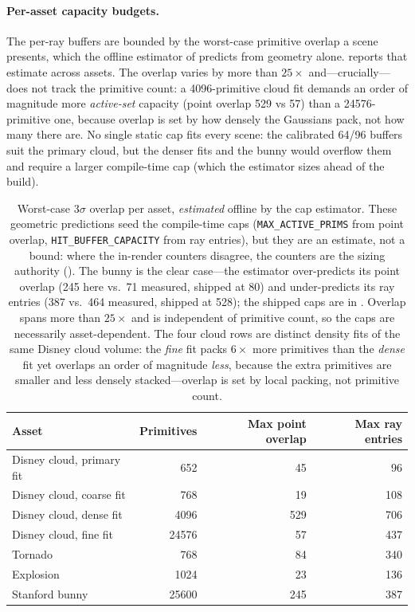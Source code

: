 \paragraph{Per-asset capacity budgets.} The per-ray buffers are bounded by the worst-case primitive
overlap a scene presents, which the offline estimator of  predicts from geometry
alone.  reports that estimate across assets. The overlap varies by more than
$25\times$ and---crucially---does not track the primitive count: a \num{4096}-primitive cloud fit
demands an order of magnitude more \emph{active-set} capacity (point overlap \num{529} vs \num{57}) than
a \num{24576}-primitive one, because overlap is set by
how densely the Gaussians pack, not how many there are. No single static cap fits every scene: the
calibrated \num{64}/\num{96} buffers suit the primary cloud, but the denser fits and the bunny would overflow them
and require a larger compile-time cap (which the estimator sizes ahead of the build).

\begin{table}[htp]
  \centering
  \begin{tabular}{@{}lrrr@{}}
    \toprule
    Asset & Primitives & Max point overlap & Max ray entries \\
    \midrule
    Disney cloud, primary fit & \num{652}   & \num{45}  & \num{96}  \\
    Disney cloud, coarse fit  & \num{768}   & \num{19}  & \num{108} \\
    Disney cloud, dense fit   & \num{4096}  & \num{529} & \num{706} \\
    Disney cloud, fine fit    & \num{24576} & \num{57}  & \num{437} \\
    Tornado                & \num{768}   & \num{84}  & \num{340} \\
    Explosion              & \num{1024}  & \num{23}  & \num{136} \\
    Stanford bunny         & \num{25600} & \num{245} & \num{387} \\
    \bottomrule
  \end{tabular}
  \caption{Worst-case $3\sigma$ overlap per asset, \emph{estimated} offline by the cap estimator. These
  geometric predictions seed the compile-time caps (\texttt{MAX\_ACTIVE\_PRIMS} from point overlap,
  \texttt{HIT\_BUFFER\_CAPACITY} from ray entries), but they are an estimate, not a bound: where the
  in-render counters disagree, the counters are the sizing authority (). The bunny is
  the clear case---the estimator over-predicts its point overlap (\num{245} here vs.\ \num{71} measured,
  shipped at \num{80}) and under-predicts its ray entries (\num{387} vs.\ \num{464} measured, shipped at
  \num{528}); the shipped caps are in . Overlap spans more than $25\times$ and is
  independent of primitive count, so the caps are necessarily asset-dependent. The four cloud rows are
  distinct density fits of the same Disney cloud volume: the \emph{fine} fit packs $6\times$ more
  primitives than the \emph{dense} fit yet overlaps an order of magnitude \emph{less}, because the extra
  primitives are smaller and less densely stacked---overlap is set by local packing, not primitive count.}
  \label{tab:overlap}
\end{table}
